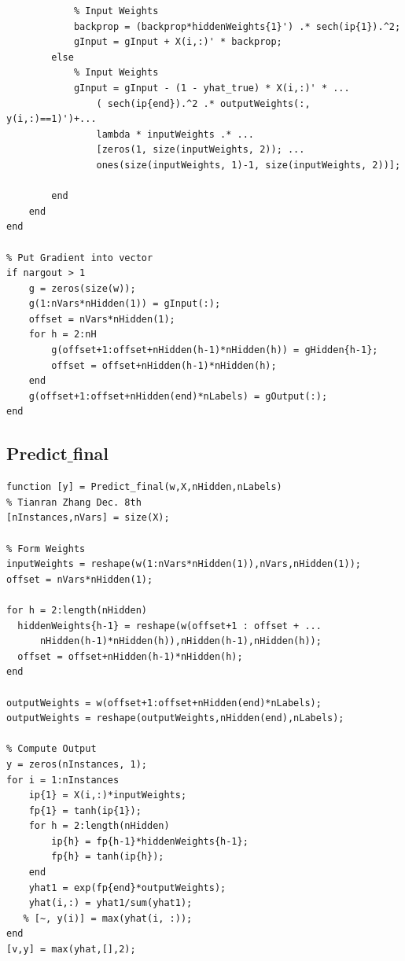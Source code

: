 \documentclass[12pt]{article}
\begin{document}
\begin{lstlisting}
            % Input Weights
            backprop = (backprop*hiddenWeights{1}') .* sech(ip{1}).^2;
            gInput = gInput + X(i,:)' * backprop;
        else
            % Input Weights
            gInput = gInput - (1 - yhat_true) * X(i,:)' * ...
                ( sech(ip{end}).^2 .* outputWeights(:, y(i,:)==1)')+...
                lambda * inputWeights .* ...
                [zeros(1, size(inputWeights, 2)); ...
                ones(size(inputWeights, 1)-1, size(inputWeights, 2))];
            
        end
    end
end

% Put Gradient into vector
if nargout > 1
    g = zeros(size(w));
    g(1:nVars*nHidden(1)) = gInput(:);
    offset = nVars*nHidden(1);
    for h = 2:nH
        g(offset+1:offset+nHidden(h-1)*nHidden(h)) = gHidden{h-1};
        offset = offset+nHidden(h-1)*nHidden(h);
    end
    g(offset+1:offset+nHidden(end)*nLabels) = gOutput(:);
end
\end{lstlisting}
\subsection{Predict$\_$final}
\begin{lstlisting}
function [y] = Predict_final(w,X,nHidden,nLabels)
% Tianran Zhang Dec. 8th
[nInstances,nVars] = size(X);

% Form Weights
inputWeights = reshape(w(1:nVars*nHidden(1)),nVars,nHidden(1));
offset = nVars*nHidden(1);

for h = 2:length(nHidden)
  hiddenWeights{h-1} = reshape(w(offset+1 : offset + ...
      nHidden(h-1)*nHidden(h)),nHidden(h-1),nHidden(h));
  offset = offset+nHidden(h-1)*nHidden(h);
end

outputWeights = w(offset+1:offset+nHidden(end)*nLabels);
outputWeights = reshape(outputWeights,nHidden(end),nLabels);

% Compute Output
y = zeros(nInstances, 1);
for i = 1:nInstances
    ip{1} = X(i,:)*inputWeights;
    fp{1} = tanh(ip{1});
    for h = 2:length(nHidden)
        ip{h} = fp{h-1}*hiddenWeights{h-1};
        fp{h} = tanh(ip{h});
    end
    yhat1 = exp(fp{end}*outputWeights);
    yhat(i,:) = yhat1/sum(yhat1);
   % [~, y(i)] = max(yhat(i, :));
end
[v,y] = max(yhat,[],2);

\end{lstlisting}
\end{document}
